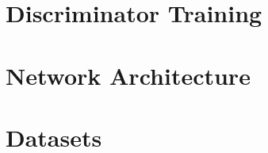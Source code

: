 
\section{Discriminator Training}%
\label{sec:discriminator_training}


\section{Network Architecture}%
\label{sec:network_architecture}


\section{Datasets}%
\label{sec:datasets}


